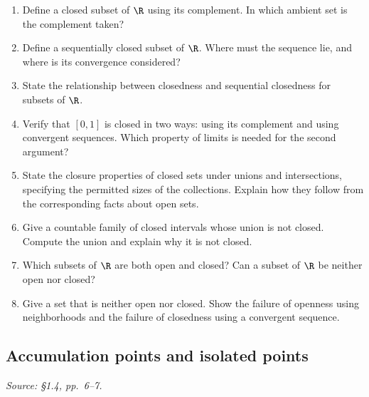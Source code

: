 \begin{enumerate}[resume]
  \item Define a closed subset of \(\R\) using its complement.
    In which ambient set is the complement taken?

  \item Define a sequentially closed subset of \(\R\).
    Where must the sequence lie, and where is its convergence considered?

  \item State the relationship between closedness and sequential
    closedness for subsets of \(\R\).

  \item Verify that \([0,1]\) is closed in two ways: using its complement
    and using convergent sequences. Which property of limits is needed
    for the second argument?

  \item State the closure properties of closed sets under unions and
    intersections, specifying the permitted sizes of the collections.
    Explain how they follow from the corresponding facts about open sets.

  \item Give a countable family of closed intervals whose union is not
    closed. Compute the union and explain why it is not closed.

  \item Which subsets of \(\R\) are both open and closed?
    Can a subset of \(\R\) be neither open nor closed?

  \item Give a set that is neither open nor closed. Show the failure of
    openness using neighborhoods and the failure of closedness using
    a convergent sequence.
\end{enumerate}

\subsection{Accumulation points and isolated points}
\textit{Source: \S1.4, pp.~6--7.}

